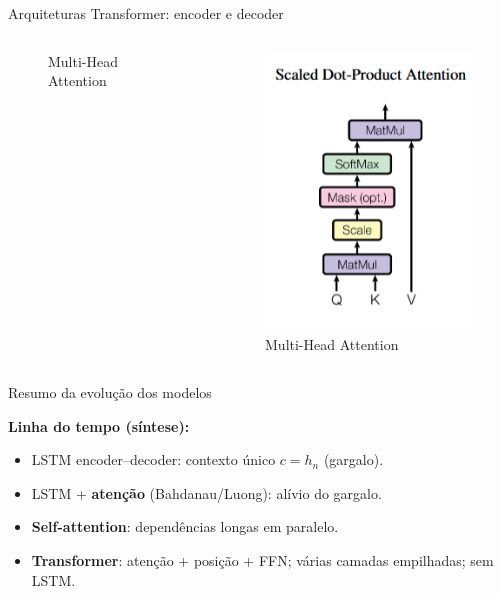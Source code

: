 \documentclass{beamer}
\begin{document}
\begin{frame}{Arquiteturas Transformer: encoder e decoder \cite{vaswani2017attention}}
\begin{columns}[t]
\begin{figure}
		\caption{Multi-Head Attention}
	\end{figure}
	\begin{figure}
		\centering
		\includegraphics[height=0.75\textheight]{assets/transformer-scaled-dot-attention.png}
		\caption{Multi-Head Attention}
	\end{figure}
\end{columns}
\end{frame}
\begin{frame}{Resumo da evolução dos modelos}

	\textbf{Linha do tempo (síntese):}
	\begin{itemize}
		\item LSTM encoder--decoder: contexto único $c=h_n$ (gargalo).
		\item LSTM + \textbf{atenção} (Bahdanau/Luong): alívio do gargalo.
		\item \textbf{Self-attention}: dependências longas em paralelo.
		\item \textbf{Transformer}: atenção + posição + FFN; várias camadas empilhadas; sem LSTM.
	\end{itemize}
\end{frame}

\end{document}
